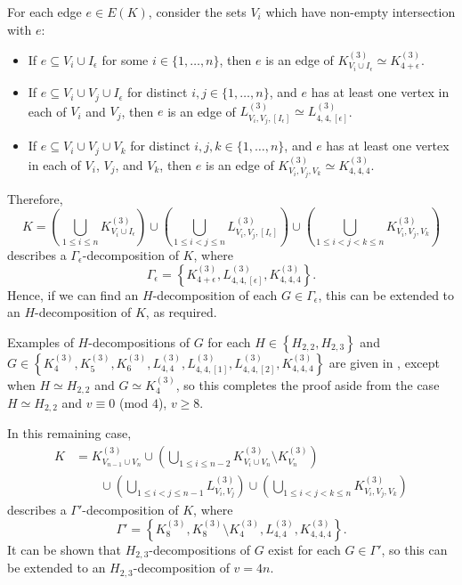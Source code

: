 For each edge $e \in E(K)$, consider the sets $V_i$ which have non-empty intersection with $e$:
\begin{itemize}
    \item If $e \subseteq V_i \cup I_\epsilon$ for some $i \in \{1,\ldots,n\}$, then $e$ is an edge of $K_{V_i \cup I_\epsilon}^{(3)} \simeq K_{4+\epsilon}^{(3)}$.
    \item If $e \subseteq V_i \cup V_j \cup I_\epsilon$ for distinct $i, j \in \{1,\ldots,n\}$, and $e$ has at least one vertex in each of $V_i$ and $V_j$, then $e$ is an edge of $L_{V_i,V_j,[I_\epsilon]}^{(3)} \simeq L_{4,4,[\epsilon]}^{(3)}$.
    \item If $e \subseteq V_i \cup V_j \cup V_k$ for distinct $i, j, k \in \{1,\ldots,n\}$, and $e$ has at least one vertex in each of $V_i$, $V_j$, and $V_k$, then $e$ is an edge of $K_{V_i,V_j,V_k}^{(3)} \simeq K_{4,4,4}^{(3)}$.
\end{itemize}
Therefore,
\[
    K
    = \left( \bigcup_{1 \leq i \leq n} K_{V_i \cup I_\epsilon}^{(3)} \right)
    \cup \left( \bigcup_{1 \leq i < j \leq n} L_{V_i,V_j,[I_\epsilon]}^{(3)} \right)
    \cup \left( \bigcup_{1 \leq i < j < k \leq n} K_{V_i,V_j,V_k}^{(3)} \right)
\]
describes a $\Gamma_\epsilon$-decomposition of $K$, where
\[
    \Gamma_\epsilon = \left\{ K_{4+\epsilon}^{(3)}, L_{4,4,[\epsilon]}^{(3)}, K_{4,4,4}^{(3)} \right\}.
\]
Hence, if we can find an $H$-decomposition of each $G \in \Gamma_\epsilon$, this can be extended to an $H$-decomposition of $K$, as required.

Examples of $H$-decompositions of $G$ for each $H \in \left\{ H_{2,2}, H_{2,3} \right\}$
and $G \in \left\{ K_{4}^{(3)}, K_{5}^{(3)}, K_{6}^{(3)}, L_{4,4}^{(3)}, L_{4,4,[1]}^{(3)}, L_{4,4,[2]}^{(3)}, K_{4,4,4}^{(3)} \right\}$
are given in \cite{bryant}, except when $H \simeq H_{2,2}$ and $G \simeq K_{4}^{(3)}$,
so this completes the proof aside from the case $H \simeq H_{2,2}$ and $v \equiv 0$ (mod $4$), $v \geq 8$.

In this remaining case,
\begin{align*}
    K &= K_{V_{n-1} \cup V_n}^{(3)}
    \cup \left( \bigcup_{1 \leq i \leq n-2} K_{V_i \cup V_n}^{(3)} \setminus K_{V_n}^{(3)} \right) \\
    & \quad \quad \cup \left( \bigcup_{1 \leq i < j \leq n-1} L_{V_i, V_j}^{(3)} \right)
    \cup \left( \bigcup_{1 \leq i < j < k \leq n} K_{V_i, V_j, V_k}^{(3)} \right)
\end{align*}
describes a $\Gamma'$-decomposition of $K$, where
\[
    \Gamma' = \left\{ K_{8}^{(3)}, K_{8}^{(3)} \setminus K_{4}^{(3)}, L_{4,4}^{(3)}, K_{4,4,4}^{(3)} \right\}.
\]
It can be shown that $H_{2,3}$-decompositions of $G$ exist for each $G \in \Gamma'$, so this can be extended to
an $H_{2,3}$-decomposition of $v = 4n$.

